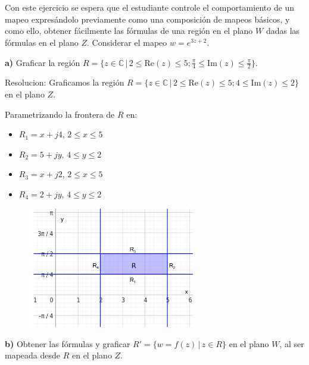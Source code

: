 \documentclass[12pt]{report}
\begin{document}
\clearpage

\chapter{}%

Con este ejercicio se espera que el estudiante controle el comportamiento de un mapeo expresándolo previamente como una composición de mapeos básicos, y como ello, obtener fácilmente las fórmulas de una región en el plano $W$ dadas las fórmulas en el plano $Z$. Considerar el mapeo $w = e^{3z + 2}$.

\textbf{a)} Graficar la región $R = \{z \in \mathbb{C} \, | \, 2 \leq \text{Re}(z) \leq 5; \frac{\pi}{4} \leq \text{Im}(z) \leq \frac{\pi}{2}\}$.

Resolucion:
Graficamos la región $R = \{z \in \mathbb{C} \, | \, 2 \leq \text{Re}(z) \leq 5; 4 \leq \text{Im}(z) \leq 2\}$ en el plano $Z$.

Parametrizando la frontera de $R$ en:
\begin{itemize}
    \item $R_1 = x + j4$, $2 \leq x \leq 5$
    \item $R_2 = 5 + jy$, $4 \leq y \leq 2$
    \item $R_3 = x + j2$, $2 \leq x \leq 5$
    \item $R_4 = 2 + jy$, $4 \leq y \leq 2$
\end{itemize}


\begin{figure}[h] %
    \centering %
    \includegraphics[width=0.65\textwidth]{./Imagenes/foto1Ej4.png} %
\end{figure}

\textbf{b)} Obtener las fórmulas y graficar $R' = \{w = f(z) \, | \, z \in R\}$ en el plano $W$, al ser mapeada desde $R$ en el plano $Z$.
\end{document}
